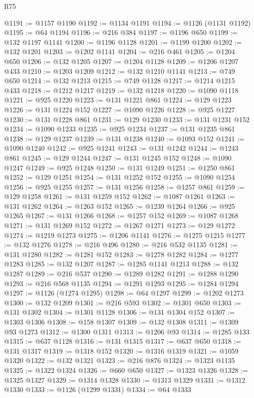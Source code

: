 \begin{lexlean}{R75}
\begin{coremodule}
@1191 := @1157 @1190
@1192 := @1134 @1191
@1194 := @1126 (@1131 @1192)
@1195 := @64 @1194
@1196 := @216 @384
@1197 := @1196 @650
@1199 := @132 @1197 @1141
@1200 := @1196 @1128
@1201 := @1199 @1200
@1202 := @132 @1201
@1203 := @1202 @1141
@1204 := @216 @461
@1205 := @1204 @650
@1206 := @132 @1205
@1207 := @1204 @1128
@1209 := @1206 @1207 @433
@1210 := @1203 @1209
@1212 := @132 @1210 @1141
@1213 := @749 @650
@1214 := @132 @1213
@1215 := @749 @1128
@1217 := @1214 @1215 @433
@1218 := @1212 @1217
@1219 := @132 @1218
@1220 := @1090 @1118
@1221 := @925 @1220
@1223 := @131 @1221 @861
@1224 := @129 @1223
@1226 := @131 @1224 @152
@1227 := @1090 @1226
@1228 := @925 @1227
@1230 := @131 @1228 @861
@1231 := @129 @1230
@1233 := @131 @1231 @152
@1234 := @1090 @1233
@1235 := @925 @1234
@1237 := @131 @1235 @861
@1238 := @129 @1237
@1239 := @131 @1238
@1240 := @1093 @152
@1241 := @1090 @1240
@1242 := @925 @1241
@1243 := @131 @1242
@1244 := @1243 @861
@1245 := @129 @1244
@1247 := @131 @1245 @152
@1248 := @1090 @1247
@1249 := @925 @1248
@1250 := @131 @1249
@1251 := @1250 @861
@1252 := @129 @1251
@1254 := @131 @1252 @152
@1255 := @1090 @1254
@1256 := @925 @1255
@1257 := @131 @1256
@1258 := @1257 @861
@1259 := @129 @1258
@1261 := @131 @1259 @152
@1262 := @1087 @1261
@1263 := @131 @1262
@1264 := @1263 @152
@1265 := @1239 @1264
@1266 := @925 @1265
@1267 := @131 @1266
@1268 := @1257 @152
@1269 := @1087 @1268
@1271 := @131 @1269 @152
@1272 := @1267 @1271
@1273 := @129 @1272
@1274 := @1219 @1273
@1275 := @1206 @1141
@1276 := @1275 @1215
@1277 := @132 @1276
@1278 := @216 @496
@1280 := @216 @532 @1135
@1281 := @131 @1280
@1282 := @1281 @152
@1283 := @1278 @1282
@1284 := @1277 @1283
@1285 := @132 @1207
@1287 := @1285 @1141 @1213
@1288 := @132 @1287
@1289 := @216 @537
@1290 := @1289 @1282
@1291 := @1288 @1290
@1293 := @216 @568 @1135
@1294 := @1291 @1293
@1295 := @1284 @1294
@1297 := @1126 (@1274 @1295)
@1298 := @64 @1297
@1299 := @1202 @1273
@1300 := @132 @1209
@1301 := @216 @593
@1302 := @1301 @650
@1303 := @131 @1302
@1304 := @1301 @1128
@1306 := @131 @1304 @152
@1307 := @1303 @1306
@1308 := @158 @1307
@1309 := @132 @1308
@1311 := @1309 @93 @1273
@1312 := @1300 @1311
@1313 := @1206 @93
@1314 := @1285 @133
@1315 := @637 @1128
@1316 := @131 @1315
@1317 := @637 @650
@1318 := @131 @1317
@1319 := @1318 @152
@1320 := @1316 @1319
@1321 := @1059 @1320
@1322 := @132 @1321
@1323 := @216 @876
@1324 := @1323 @1135
@1325 := @1322 @1324
@1326 := @660 @650
@1327 := @1323 @1326
@1328 := @1325 @1327
@1329 := @1314 @1328
@1330 := @1313 @1329
@1331 := @1312 @1330
@1333 := @1126 (@1299 @1331)
@1334 := @64 @1333

\end{coremodule}
\end{lexlean}
